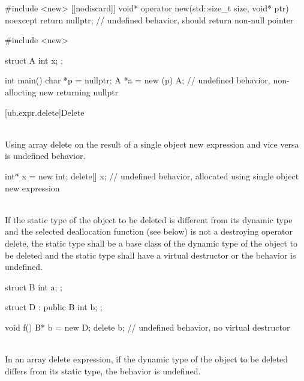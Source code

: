 {\pnum
\begin{example}
\begin{codeblock}
#include <new>
[[nodiscard]] void* operator new(std::size_t size, void* ptr) noexcept {
  return nullptr;       // undefined behavior,  should return non-null pointer
}
\end{codeblock}
\end{example}
\begin{example}
\begin{codeblock}
#include <new>

struct A {
  int x;
};

int main() {
  char *p = nullptr;
  A *a = new (p) A;     // undefined behavior, non-allocting new returning nullptr
}
\end{codeblock}
\end{example}


[ub.expr.delete]{Delete}

\pnum
{} \\
Using array delete on the result of a single object new expression and vice versa is undefined behavior.

\pnum
\begin{example}
\begin{codeblock}
int* x = new int;
delete[] x;             // undefined behavior, allocated using single object new expression
\end{codeblock}
\end{example}


\pnum
{} \\
If the static type of the object to be deleted is different from its dynamic
type and the selected deallocation function (see below) is not a destroying operator delete, the static type
shall be a base class of the dynamic type of the object to be deleted and the static type shall have a virtual
destructor or the behavior is undefined.

\pnum
\begin{example}
\begin{codeblock}
struct B {
  int a;
};

struct D : public B {
  int b;
};

void f() {
  B* b = new D;
  delete b;             // undefined behavior, no virtual destructor
}
\end{codeblock}
\end{example}


\pnum
{} \\
In an array delete expression, if the dynamic type of the object to be deleted differs from its static type, the behavior is undefined.

}
